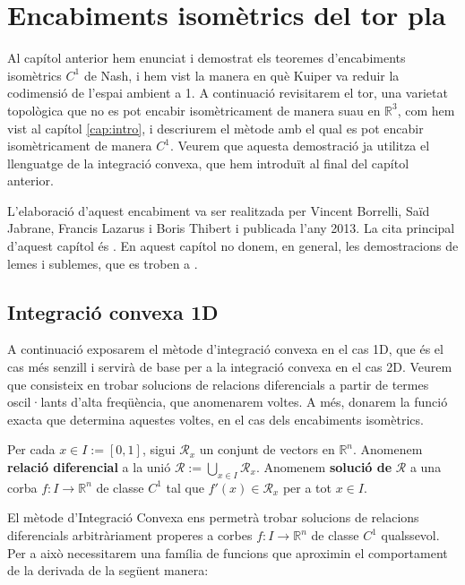 \chapter{Encabiments isomètrics del tor pla}

Al capítol anterior hem enunciat i demostrat els teoremes d'encabiments isomètrics $C^1$ de Nash, i hem vist la manera en què Kuiper va reduir la codimensió de l'espai ambient a 1. A continuació revisitarem el tor, una varietat topològica que no es pot encabir isomètricament de manera suau en $\mathbb R^3$, com hem vist al capítol \ref{cap:intro}, i descriurem el mètode amb el qual es pot encabir isomètricament de manera $C^1$. 
Veurem que aquesta demostració ja utilitza el llenguatge de la integració convexa, que hem introduït al final del capítol anterior.

L'elaboració d'aquest encabiment va ser realitzada per Vincent Borrelli, Saïd Jabrane, Francis Lazarus i Boris Thibert i publicada l'any 2013. La cita principal d'aquest capítol és \cite{borrelli2013}. En aquest capítol no donem, en general, les demostracions de lemes i sublemes, que es troben a \cite{borrelli2013}.

\section{Integració convexa 1D}
A continuació exposarem el mètode d'integració convexa en el cas 1D, que és el cas més senzill i servirà de base per a la integració convexa en el cas 2D. Veurem que consisteix en trobar solucions de relacions diferencials a partir de termes oscil·lants d'alta freqüència, que anomenarem voltes. A més, donarem la funció exacta que determina aquestes voltes, en el cas dels encabiments isomètrics.

\begin{defi}
    Per cada $x\in I := [0,1]$, sigui $\mathcal R_x$ un conjunt de vectors en $\mathbb R^n$. Anomenem \textbf{relació diferencial} a la unió $\mathcal R := \bigcup_{x\in I} \mathcal R_x$. Anomenem \textbf{solució de} $\mathcal R$ a una corba $f:I\to\mathbb R^n$ de classe $C^1$ tal que $f'(x)\in\mathcal R_x$ per a tot $x\in I$.
\end{defi}

El mètode d'Integració Convexa ens permetrà trobar solucions de relacions diferencials arbitràriament properes a corbes $f:I\to\mathbb R^n$ de classe $C^1$ qualssevol. Per a això necessitarem una família de funcions que aproximin el comportament de la derivada de la següent manera:

